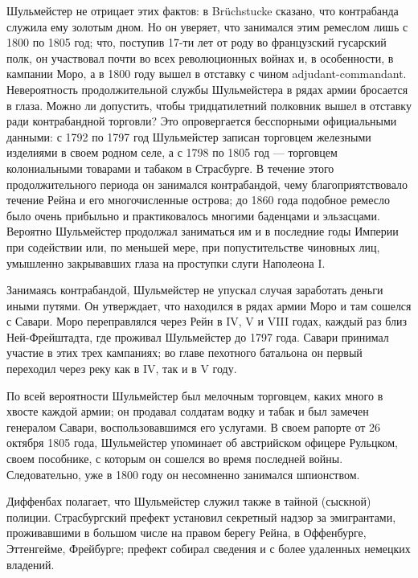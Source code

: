 \documentclass[
  oneside,
  12pt,
  titlepage]{book}
\begin{document}
Шульмейстер не отрицает этих фактов: в Brüchstucke сказано, что контрабанда служила ему золотым дном. Но он уверяет, что занимался этим ремеслом лишь с 1800 по 1805 год; что, поступив 17-ти лет от роду во французский гусарский полк, он участвовал почти во всех революционных войнах и, в особенности, в кампании Моро, а в 1800 году вышел в отставку с чином adjudant-commandant. Невероятность продолжительной службы Шульмейстера в рядах армии бросается в глаза. Можно ли допустить, чтобы тридцатилетний полковник вышел в отставку ради контрабандной торговли? Это опровергается бесспорными официальными данными: с 1792 по 1797 год Шульмейстер записан торговцем железными изделиями в своем родном селе, а с 1798 по 1805 год --- торговцем колониальными товарами и табаком в Страсбурге. В течение этого продолжительного периода он занимался контрабандой, чему благоприятствовало течение Рейна и его многочисленные острова; до 1860 года подобное ремесло было очень прибыльно и практиковалось многими баденцами и эльзасцами. Вероятно Шульмейстер продолжал заниматься им и в последние годы Империи при содействии или, по меньшей мере, при попустительстве чиновных лиц, умышленно закрывавших глаза на проступки слуги Наполеона I.

Занимаясь контрабандой, Шульмейстер не упускал случая заработать деньги иными путями. Он утверждает, что находился в рядах армии Моро и там сошелся с Савари. Моро переправлялся через Рейн в IV, V и VIII годах, каждый раз близ Ней-Фрейштадта, где проживал Шульмейстер до 1797 года. Савари принимал участие в этих трех кампаниях; во главе пехотного батальона он первый переходил через реку как в IV, так и в V году.

По всей вероятности Шульмейстер был мелочным торговцем, каких много в хвосте каждой армии; он продавал солдатам водку и табак и был замечен генералом Савари, воспользовавшимся его услугами. В своем рапорте от 26 октября 1805 года, Шульмейстер упоминает об австрийском офицере Рульцком, своем пособнике, с которым он сошелся во время последней войны. Следовательно, уже в 1800 году он несомненно занимался шпионством.

Диффенбах полагает, что Шульмейстер служил также в тайной (сыскной) полиции. Страсбургский префект установил секретный надзор за эмигрантами, проживавшими в большом числе на правом берегу Рейна, в Оффенбурге, Эттенгейме, Фрейбурге; префект собирал сведения и с более удаленных немецких владений.
\end{document}
